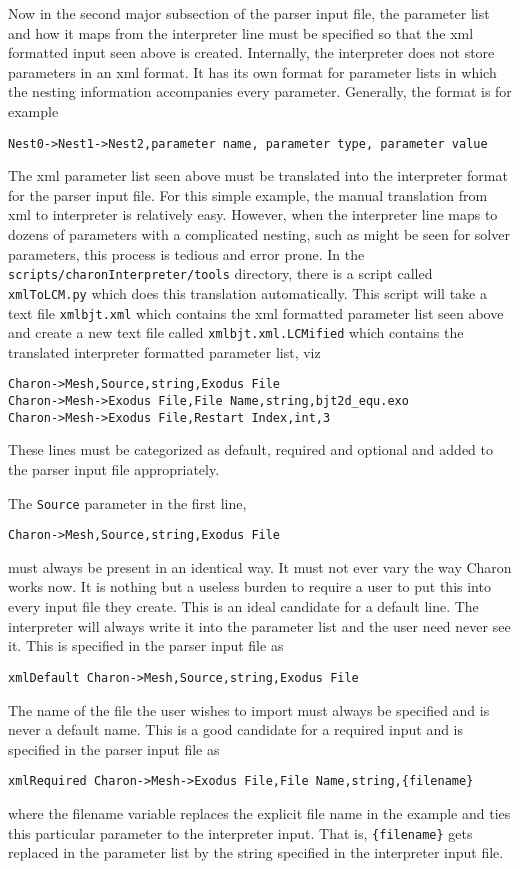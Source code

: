 Now in the second major subsection of the parser input file, the
parameter list and how it maps from the interpreter line must be
specified so that the xml formatted input seen above is created.
Internally, the interpreter does not store parameters in an xml
format.  It has its own format for parameter lists in which the
nesting information accompanies every parameter.  Generally, the
format is for example
\begin{lstlisting}
Nest0->Nest1->Nest2,parameter name, parameter type, parameter value
\end{lstlisting}
The xml parameter list seen above must be translated into the
interpreter format for the parser input file. For this simple example,
the manual translation from xml to interpreter is relatively easy.
However, when the interpreter line maps to dozens of parameters with a
complicated nesting, such as might be seen for solver parameters, this
process is tedious and error prone.  In the
\texttt{scripts/charonInterpreter/tools} directory, there is a script
called \texttt{xmlToLCM.py} which does this translation automatically.
This script will take a text file \texttt{xmlbjt.xml} which contains
the xml formatted parameter list seen above and create a new text file
called \texttt{xmlbjt.xml.LCMified} which contains the translated
interpreter formatted parameter list, viz
\begin{lstlisting}
Charon->Mesh,Source,string,Exodus File
Charon->Mesh->Exodus File,File Name,string,bjt2d_equ.exo
Charon->Mesh->Exodus File,Restart Index,int,3
\end{lstlisting}
These lines must be categorized as default, required and optional and
added to the parser input file appropriately.

The \texttt{Source} parameter in the first line,
\begin{lstlisting}
Charon->Mesh,Source,string,Exodus File
\end{lstlisting}
must always be present in an identical way.  It must not ever vary the
way Charon works now.  It is nothing but a useless burden to require a
user to put this into every input file they create.  This is an ideal
candidate for a default line.  The interpreter will always write it
into the parameter list and the user need never see it.  This is
specified in the parser input file as
\begin{lstlisting}
xmlDefault Charon->Mesh,Source,string,Exodus File
\end{lstlisting}
The name of the file the user wishes to import must always be
specified and is never a default name.  This is a good candidate for a
required input and is specified in the parser input file as
\begin{lstlisting}
xmlRequired Charon->Mesh->Exodus File,File Name,string,{filename}
\end{lstlisting}
where the filename variable replaces the explicit file name in the
example and ties this particular parameter to the interpreter input.
That is, \texttt{\{filename\}} gets replaced in the parameter list by
the string specified in the interpreter input file.

